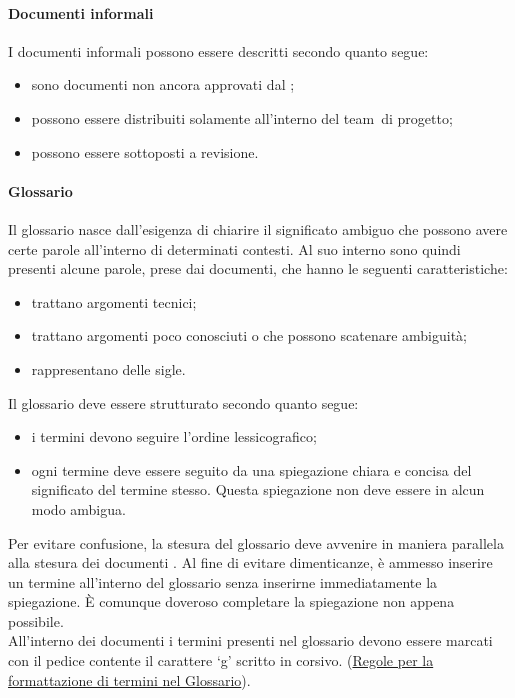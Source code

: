 \documentclass[../NormeProgetto.tex]{subfiles}
\begin{document}
		\paragraph{Documenti informali}
			I documenti informali possono essere descritti secondo quanto segue:
			\begin{itemize}
				\item sono documenti non ancora approvati dal \responsabilediprogetto;
				\item possono essere distribuiti solamente all'interno del team\g\ di progetto;
				\item possono essere sottoposti a revisione.
			\end{itemize}
		
		\paragraph{Glossario} \label{sec:Glossario}
			Il glossario nasce dall'esigenza di chiarire il significato ambiguo che possono avere certe parole all'interno di determinati contesti. Al suo interno sono quindi presenti alcune parole, prese dai documenti, che hanno le seguenti caratteristiche:
			\begin{itemize}
				\item trattano argomenti tecnici;
				\item trattano argomenti poco conosciuti o che possono scatenare ambiguità;
				\item rappresentano delle sigle.
			\end{itemize}
			Il glossario deve essere strutturato secondo quanto segue:
			\begin{itemize}
				\item i termini devono seguire l'ordine lessicografico;
				\item ogni termine deve essere seguito da una spiegazione chiara e concisa del significato del termine stesso. Questa spiegazione non deve essere in alcun modo ambigua.
			\end{itemize}
			Per evitare confusione, la stesura del glossario deve avvenire in maniera parallela alla stesura dei documenti . Al fine di evitare dimenticanze, è ammesso inserire un termine all'interno del glossario senza inserirne immediatamente la spiegazione. È comunque doveroso completare la spiegazione non appena possibile. \\ All'interno dei documenti i termini presenti nel glossario devono essere marcati con il pedice contente il carattere `g' scritto in corsivo. (\hyperref[sec:Formattazione termini nel glossario]{Regole per la formattazione di termini nel Glossario}).
		
\end{document}
